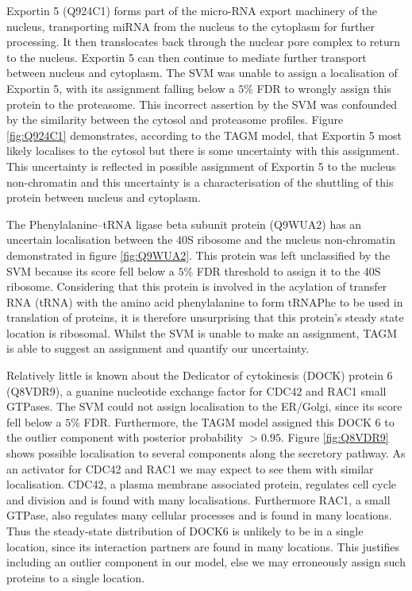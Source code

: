 \documentclass[12pt,english]{article}\usepackage[]{graphicx}\usepackage[]{color}
\begin{document}
\bigskip

Exportin 5 (Q924C1) forms part of the micro-RNA export machinery of
the nucleus, transporting miRNA from the nucleus to the cytoplasm for
further processing.  It then translocates back through the nuclear
pore complex to return to the nucleus.  Exportin 5 can then continue
to mediate further transport between nucleus and cytoplasm.  The SVM
was unable to assign a localisation of Exportin 5, with its assignment
falling below a $5\%$ FDR to wrongly assign this protein to the
proteasome. This incorrect assertion by the SVM was confounded by the
similarity between the cytosol and proteasome profiles.  Figure
\ref{fig:Q924C1} demonstrates, according to the TAGM model, that
Exportin 5 most likely localises to the cytosol but there is some
uncertainty with this assignment.  This uncertainty is reflected in
possible assignment of Exportin 5 to the nucleus non-chromatin and
this uncertainty is a characterisation of the shuttling of this
protein between nucleus and cytoplasm.

The Phenylalanine--tRNA ligase beta subunit protein (Q9WUA2) has an
uncertain localisation between the 40S ribosome and the nucleus
non-chromatin demonstrated in figure \ref{fig:Q9WUA2}. This protein
was left unclassified by the SVM because its score fell below a $5\%$
FDR threshold to assign it to the 40S ribosome. Considering that this
protein is involved in the acylation of transfer RNA (tRNA) with the
amino acid phenylalanine to form tRNAPhe to be used in translation of
proteins, it is therefore unsurprising that this protein's steady
state location is ribosomal.  Whilst the SVM is unable to make an
assignment, TAGM is able to suggest an assignment and quantify our
uncertainty.

Relatively little is known about the Dedicator of cytokinesis (DOCK)
protein 6 (Q8VDR9), a guanine nucleotide exchange factor for CDC42 and
RAC1 small GTPases. The SVM could not assign localisation to the
ER/Golgi, since its score fell below a $5\%$ FDR. Furthermore, the
TAGM model assigned this DOCK 6 to the outlier component with
posterior probability $>0.95$.  Figure \ref{fig:Q8VDR9} shows possible
localisation to several components along the secretory pathway. As an
activator for CDC42 and RAC1 we may expect to see them with similar
localisation. CDC42, a plasma membrane associated protein, regulates
cell cycle and division and is found with many
localisations. Furthermore RAC1, a small GTPase, also regulates many
cellular processes and is found in many locations. Thus the
steady-state distribution of DOCK6 is unlikely to be in a single
location, since its interaction partners are found in many
locations. This justifies including an outlier component in our model,
else we may erroneously assign such proteins to a single location.
\end{document}
